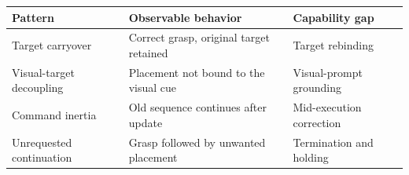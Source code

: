 \begin{center}
\setlength{\belowcaptionskip}{\baselineskip}
\label{tab:behavior-failure-patterns}
\normalsize
\setlength{\tabcolsep}{3.5pt}
\begin{tabular}{@{}lll@{}}
\toprule
Pattern & Observable behavior & Capability gap \\
\midrule
Target carryover & Correct grasp, original target retained & Target rebinding \\
Visual-target decoupling & Placement not bound to the visual cue & Visual-prompt grounding \\
Command inertia & Old sequence continues after update & Mid-execution correction \\
Unrequested continuation & Grasp followed by unwanted placement & Termination and holding \\
\bottomrule
\end{tabular}
\end{center}
